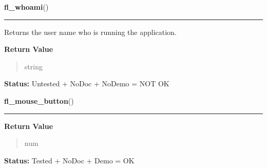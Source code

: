     \label{xformslib:library:fl_whoami}

    \vspace{0.5ex}

\hspace{.8\funcindent}\begin{boxedminipage}{\funcwidth}

    \raggedright \textbf{fl\_whoami}()

    \vspace{-1.5ex}

    \rule{\textwidth}{0.5\fboxrule}
\setlength{\parskip}{2ex}
    Returns the user name who is running the application.

\setlength{\parskip}{1ex}
      \textbf{Return Value}
    \vspace{-1ex}

      \begin{quote}
      string

      \end{quote}

\textbf{Status:} Untested + NoDoc + NoDemo = NOT OK



    \end{boxedminipage}

    \label{xformslib:library:fl_mouse_button}

    \vspace{0.5ex}

\hspace{.8\funcindent}\begin{boxedminipage}{\funcwidth}

    \raggedright \textbf{fl\_mouse\_button}()

    \vspace{-1.5ex}

    \rule{\textwidth}{0.5\fboxrule}
\setlength{\parskip}{2ex}
\setlength{\parskip}{1ex}
      \textbf{Return Value}
    \vspace{-1ex}

      \begin{quote}
      num

      \end{quote}

\textbf{Status:} Tested + NoDoc + Demo = OK



    \end{boxedminipage}

